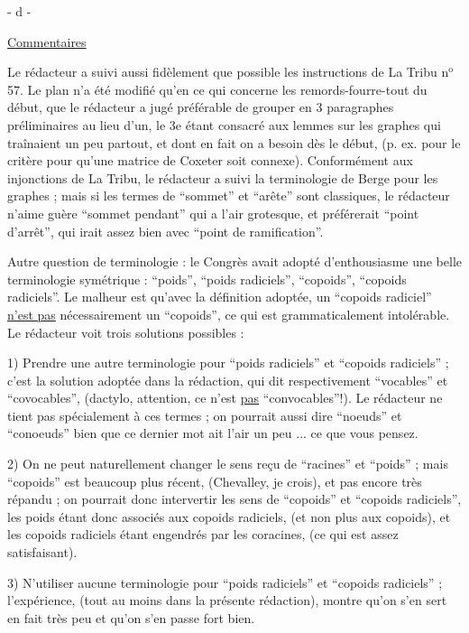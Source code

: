 
- d -

\uline{Commentaires}

Le rédacteur a suivi aussi fidèlement que possible les instructions de La Tribu n$^{\mathrm{o}}$ 57. Le plan n'a été modifié qu'en ce qui concerne les remords-fourre-tout du début, que le rédacteur a jugé préférable de grouper en 3 paragraphes préliminaires au lieu d'un, le 3e étant consacré aux lemmes sur les graphes qui traînaient un peu partout, et dont en fait on a besoin dès le début, (p. ex. pour le critère pour qu'une matrice de Coxeter soit connexe). Conformément aux injonctions de La Tribu, le rédacteur a suivi la terminologie de Berge pour les graphes ; mais si les termes de ``sommet'' et ``arête'' sont classiques, le rédacteur n'aime guère ``sommet pendant'' qui a l'air grotesque, et préférerait ``point d'arrêt'', qui irait assez bien avec ``point de ramification''.

Autre question de terminologie : le Congrès avait adopté d'enthousiasme une belle terminologie symétrique : ``poids'', ``poids radiciels'', ``copoids'', ``copoids radiciels''. Le malheur est qu'avec la définition adoptée, un ``copoids radiciel'' \uline{n'est pas} nécessairement un ``copoids'', ce qui est grammaticalement intolérable. Le rédacteur voit trois solutions possibles :

1) Prendre une autre terminologie pour ``poids radiciels'' et ``copoids radiciels'' ; c'est la solution adoptée dans la rédaction, qui dit respectivement ``vocables'' et ``covocables'', (dactylo, attention, ce n'est \uline{pas} ``convocables''!). Le rédacteur ne tient pas spécialement à ces termes ; on pourrait aussi dire ``noeuds'' et ``conoeuds'' bien que ce dernier mot ait l'air un peu ... ce que vous pensez.

2) On ne peut naturellement changer le sens reçu de ``racines'' et ``poids'' ; mais ``copoids'' est beaucoup plus récent, (Chevalley, je crois), et pas encore très répandu ; on pourrait donc intervertir les sens de ``copoids'' et ``copoids radiciels'', les poids étant donc associés aux copoids radiciels, (et non plus aux copoids), et les copoids radiciels étant engendrés par les coracines, (ce qui est assez satisfaisant).

3) N'utiliser aucune terminologie pour ``poids radiciels'' et ``copoids radiciels'' ; l'expérience, (tout au moins dans la présente rédaction), montre qu'on s'en sert en fait très peu et qu'on s'en passe fort bien.

